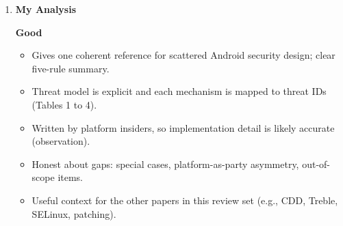 \documentclass[11pt,a4paper]{article}
\newcommand{\entrypart}[1]{\textbf{\color{accent}#1}\par\vspace{2pt}}
\begin{document}
\begin{enumerate}
    \vspace{4pt}
    \textbf{Limitations (authors)}
    \begin{itemize}[leftmargin=*,itemsep=1pt,topsep=2pt]
        \item The model has no simple, consistent formal notation; it evolved from practical experience, not top-down theory, so ``model'' is used in a looser sense.
        \item The five rules are described as the simplest current expression of how different controls combine, and these controls follow their own models that are not necessarily consistent.
        \item Deliberate special cases deviate from the model (package listing, VPN, backup, enterprise, Factory Reset Protection); the list is not comprehensive.
        \item The platform acts both as a consenting party and as enforcer; the authors admit that some components still keep an asymmetry of power.
        \item Out of scope: Google Play Protect and Play policy, replacing apps in transit at first install (signing key trusted on first use), side-channel and hardware attacks (assumes trustworthy hardware), integrity of other CPU firmware (radio, GPU, touch).
        \item Consent is a technical enforcement notion, not legal consent.
        \item Implementation details refer to Android 11 as released.
    \end{itemize}

    \item \entrypart{My Analysis}

    \textbf{Good}
    \begin{itemize}[leftmargin=*,itemsep=1pt,topsep=2pt]
        \item Gives one coherent reference for scattered Android security design; clear five-rule summary.
        \item Threat model is explicit and each mechanism is mapped to threat IDs (Tables 1 to 4).
        \item Written by platform insiders, so implementation detail is likely accurate (observation).
        \item Honest about gaps: special cases, platform-as-party asymmetry, out-of-scope items.
        \item Useful context for the other papers in this review set (e.g., CDD, Treble, SELinux, patching).
    \end{itemize}


\end{enumerate}
\end{document}
